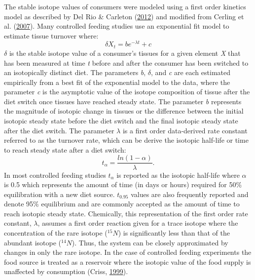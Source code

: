 \documentclass [11pt, proquest] {uwthesis}[2015/03/03]
\begin{document}
The stable isotope values of consumers were modeled using a first order
kinetics model as described by Del Rio \& Carleton
(\protect\hyperlink{ref-DelRio2012}{2012}) and modified from Cerling et
al. (\protect\hyperlink{ref-Cerling2007}{2007}). Many controlled feeding
studies use an exponential fit model to estimate tissue turnover where:
\begin{equation} 
\delta X_t = be^{-\lambda t}+c
\label{eq:one}
\end{equation}
\(\delta\) is the stable isotope value of a consumer's tissues for a
given element \emph{X} that has been measured at time \emph{t} before
and after the consumer has been switched to an isotopically distinct
diet. The parameters \emph{b}, \(\delta\), and \emph{c} are each
estimated empirically from a best fit of the exponential model to the
data, where the parameter \emph{c} is the asymptotic value of the
isotope composition of tissue after the diet switch once tissues have
reached steady state. The parameter \emph{b} represents the magnitude of
isotopic change in tissues or the difference between the initial
isotopic steady state before the diet switch and the final isotopic
steady state after the diet switch. The parameter \(\lambda\) is a first
order data-derived rate constant referred to as the turnover rate, which
can be derive the isotopic half-life or time to reach steady state after
a diet switch:
\begin{equation} 
  t_\alpha = \frac{ln(1-\alpha)}
  {\lambda}.
  \label{eq:two}
\end{equation}
In most controlled feeding studies \(t_\alpha\) is reported as the
isotopic half-life where \(\alpha\) is 0.5 which represents the amount
of time (in days or hours) required for 50\% equilibration with a new
diet source. \(t_{0.95}\) values are also frequently reported and denote
95\% equilibrium and are commonly accepted as the amount of time to
reach isotopic steady state. Chemically, this representation of the
first order rate constant, \(\lambda\), assumes a first order reaction
given for a trace isotope where the concentration of the rare isotope
(\(^{15}N\)) is significantly less than that of the abundant isotope
(\(^{14}N\)). Thus, the system can be closely approximated by changes in
only the rare isotope. In the case of controlled feeding experiments the
food source is treated as a reservoir where the isotopic value of the
food supply is unaffected by consumption (Criss,
\protect\hyperlink{ref-Criss1999}{1999}).
\end{document}
